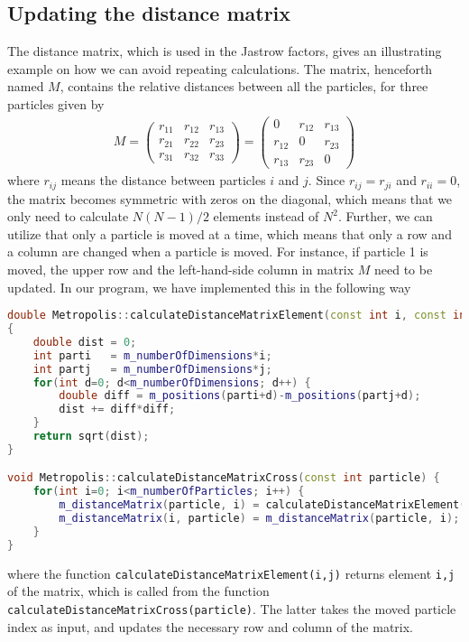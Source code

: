 \subsection{Updating the distance matrix} \label{sec:distancematrix}
The distance matrix, which is used in the Jastrow factors, gives an illustrating example on how we can avoid repeating calculations. The matrix, henceforth named $M$, contains the relative distances between all the particles, for three particles given by
\begin{eqnarray}
M=
\begin{pmatrix}
r_{11} & r_{12} & r_{13} \\
r_{21} & r_{22} & r_{23} \\
r_{31} & r_{32} & r_{33}
\end{pmatrix}
=
\begin{pmatrix}
0 & r_{12} & r_{13} \\
r_{12} & 0 & r_{23} \\
r_{13} & r_{23} & 0
\end{pmatrix}
\end{eqnarray}
where $r_{ij}$ means the distance between particles $i$ and $j$. Since $r_{ij}=r_{ji}$ and $r_{ii}=0$, the matrix becomes symmetric with zeros on the diagonal, which means that we only need to calculate $N(N-1)/2$ elements instead of $N^2$. Further, we can utilize that only a particle is moved at a time, which means that only a row and a column are changed when a particle is moved. For instance, if particle 1 is moved, the upper row and the left-hand-side column in matrix $M$ need to be updated. In our program, we have implemented this in the following way
\lstset{basicstyle=\scriptsize}
\begin{lstlisting}[language=c++]
double Metropolis::calculateDistanceMatrixElement(const int i, const int j) 
{
	double dist = 0;
	int parti   = m_numberOfDimensions*i;
	int partj   = m_numberOfDimensions*j;
	for(int d=0; d<m_numberOfDimensions; d++) {
		double diff = m_positions(parti+d)-m_positions(partj+d);
		dist += diff*diff;
	}
	return sqrt(dist);
}

void Metropolis::calculateDistanceMatrixCross(const int particle) {
	for(int i=0; i<m_numberOfParticles; i++) {
		m_distanceMatrix(particle, i) = calculateDistanceMatrixElement(particle, i);
		m_distanceMatrix(i, particle) = m_distanceMatrix(particle, i);
	}
}
\end{lstlisting}
where the function \lstinline{calculateDistanceMatrixElement(i,j)} returns element \lstinline{i,j} of the matrix, which is called from the function \lstinline{calculateDistanceMatrixCross(particle)}. The latter takes the moved particle index as input, and updates the necessary row and column of the matrix. 

